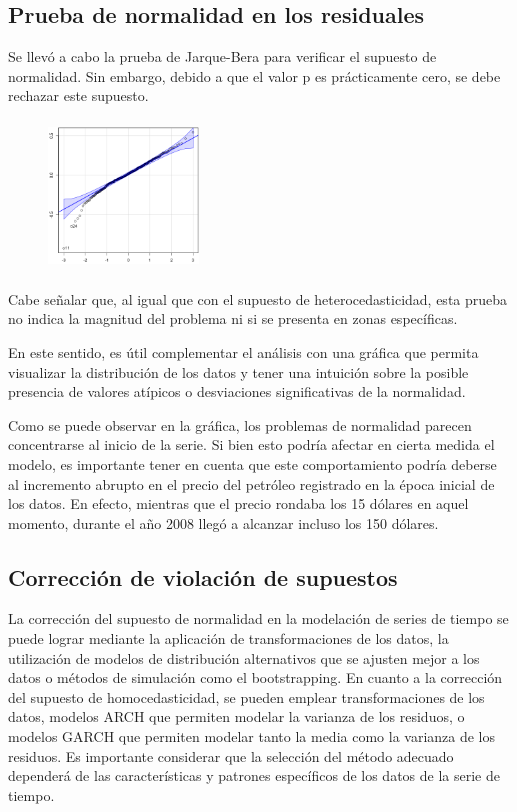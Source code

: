 \documentclass[11pt]{article}
\begin{document}
\subsection{Prueba de normalidad en los residuales}
    Se llevó a cabo la prueba de Jarque-Bera para verificar el supuesto de normalidad. Sin embargo, debido a que el valor p es prácticamente cero, se debe rechazar este supuesto.

\begin{figure}
  \centering
  \includegraphics[width=4cm, height=4cm]{Imagenes/normalidad.png}
\end{figure}
 Cabe señalar que, al igual que con el supuesto de heterocedasticidad, esta prueba no indica la magnitud del problema ni si se presenta en zonas específicas. 

En este sentido, es útil complementar el análisis con una gráfica que permita visualizar la distribución de los datos y tener una intuición sobre la posible presencia de valores atípicos o desviaciones significativas de la normalidad.

Como se puede observar en la gráfica, los problemas de normalidad parecen concentrarse al inicio de la serie. Si bien esto podría afectar en cierta medida el modelo, es importante tener en cuenta que este comportamiento podría deberse al incremento abrupto en el precio del petróleo registrado en la época inicial de los datos. En efecto, mientras que el precio rondaba los 15 dólares en aquel momento, durante el año 2008 llegó a alcanzar incluso los 150 dólares.

\subsection{Corrección de violación de supuestos}
La corrección del supuesto de normalidad en la modelación de series de tiempo se puede lograr mediante la aplicación de transformaciones de los datos, la utilización de modelos de distribución alternativos que se ajusten mejor a los datos o métodos de simulación como el bootstrapping. En cuanto a la corrección del supuesto de homocedasticidad, se pueden emplear transformaciones de los datos, modelos ARCH que permiten modelar la varianza de los residuos, o modelos GARCH que permiten modelar tanto la media como la varianza de los residuos. Es importante considerar que la selección del método adecuado dependerá de las características y patrones específicos de los datos de la serie de tiempo.
\end{document}
